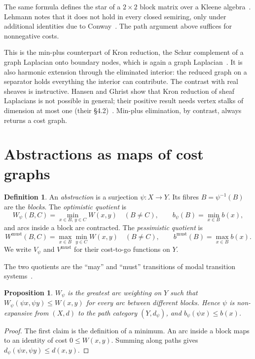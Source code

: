 \documentclass[11pt]{article}
\newtheorem{proposition}[theorem]{Proposition}
\theoremstyle{definition}
\newtheorem{definition}[theorem]{Definition}
\theoremstyle{remark}
\newcommand{\dd}{d}
\newcommand{\Wm}{W^{\mathrm{must}}}
\newcommand{\Vm}{V^{\mathrm{must}}}
\begin{document}
The same formula defines the star of a $2 \times 2$ block matrix over a Kleene
algebra~\cite{kozen1994}. Lehmann notes that it does not hold in every closed
semiring, only under additional identities due to Conway~\cite{lehmann1977}. The
path argument above suffices for nonnegative costs.

This is the min-plus counterpart of Kron reduction, the Schur complement of a
graph Laplacian onto boundary nodes, which is again a graph
Laplacian~\cite{dorfler2013}. It is also harmonic extension through the
eliminated interior: the reduced graph on a separator holds everything the
interior can contribute. The contrast with real sheaves is instructive. Hansen and
Ghrist show that Kron reduction of sheaf Laplacians is not possible in general;
their positive result needs vertex stalks of dimension at most one
(their \S4.2)~\cite{hansen2019}. Min-plus elimination, by contrast, always
returns a cost graph.

\section{Abstractions as maps of cost graphs}\label{sec:abstraction}

\begin{definition}
An \emph{abstraction} is a surjection $\psi : X \to Y$. Its fibres
$B = \psi^{-1}(B)$ are the \emph{blocks}. The \emph{optimistic quotient} is
\[
W_\psi(B, C) = \min_{x \in B,\, y \in C} W(x,y) \quad (B \ne C), \qquad
b_\psi(B) = \min_{x \in B} b(x),
\]
and arcs inside a block are contracted. The \emph{pessimistic quotient} is
\[
\Wm(B,C) = \max_{x \in B} \min_{y \in C} W(x,y) \quad (B \ne C), \qquad
b^{\mathrm{must}}(B) = \max_{x \in B} b(x).
\]
We write $V_\psi$ and $\Vm$ for their cost-to-go functions on $Y$.
\end{definition}

The two quotients are the ``may'' and ``must'' transitions of modal transition
systems~\cite{larsen1988}.

\begin{proposition}\label{prop:quotient-map}
$W_\psi$ is the greatest arc weighting on $Y$ such that
$W_\psi(\psi x, \psi y) \le W(x,y)$ for every arc between different blocks. Hence
$\psi$ is non-expansive from $(X,\dd)$ to the path category $(Y,\dd_\psi)$, and
$b_\psi(\psi x) \le b(x)$.
\end{proposition}
\begin{proof}
The first claim is the definition of a minimum. An arc inside a block maps to an
identity of cost $0 \le W(x,y)$. Summing along paths gives
$\dd_\psi(\psi x, \psi y) \le \dd(x,y)$.
\end{proof}
\end{document}
